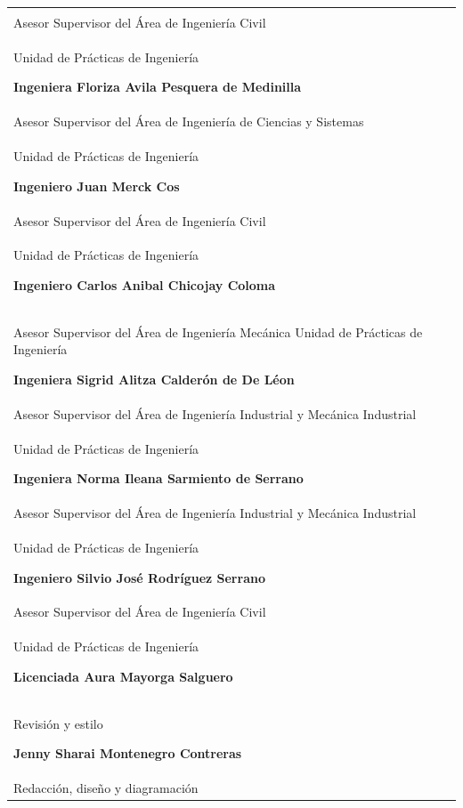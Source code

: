 \documentclass[12pt,spanish,Letterpaper,openany]{book}
\newcommand{\spacefourmilis}{\vspace{4mm}}
\begin{document}
\begin{longtable}[l]{@{}ll@{}}\endhead\begin{minipage}[t]{0.47\columnwidth}\raggedright

\hypertarget{comituxe9-editorial}{%
\section*{Comité Editorial}\label{comituxe9-editorial}}
\addcontentsline{toc}{section}{Comité Editorial}

\textbf{Ingeniero Oscar Argueta Hernández}\\
Asesor Supervisor del Área de Ingeniería Civil\\
Unidad de Prácticas de Ingeniería
\spacefourmilis

\textbf{Ingeniera Floriza Avila Pesquera de Medinilla}\\
Asesor Supervisor del Área de Ingeniería de Ciencias y Sistemas\\
Unidad de Prácticas de Ingeniería
\spacefourmilis

\textbf{Ingeniero Juan Merck Cos}\\
Asesor Supervisor del Área de Ingeniería Civil\\
Unidad de Prácticas de Ingeniería
\spacefourmilis

\textbf{Ingeniero Carlos Anibal Chicojay Coloma}\\
Asesor Supervisor del Área de Ingeniería Mecánica
Unidad de Prácticas de Ingeniería
\spacefourmilis

\textbf{Ingeniera Sigrid Alitza Calderón de De Léon}\\
Asesor Supervisor del Área de Ingeniería Industrial y Mecánica Industrial\\
Unidad de Prácticas de Ingeniería
\spacefourmilis

\textbf{Ingeniera Norma Ileana Sarmiento de Serrano}\\
Asesor Supervisor del Área de Ingeniería Industrial y Mecánica Industrial\\
Unidad de Prácticas de Ingeniería
\spacefourmilis

\textbf{Ingeniero Silvio José Rodríguez Serrano}\\
Asesor Supervisor del Área de Ingeniería Civil\\
Unidad de Prácticas de Ingeniería
\spacefourmilis

\textbf{Licenciada Aura Mayorga Salguero}\\
Revisión y estilo
\spacefourmilis

\textbf{Jenny Sharai Montenegro Contreras}\\
Redacción, diseño y diagramación
\spacefourmilis

\end{minipage}\end{longtable}
\end{document}
